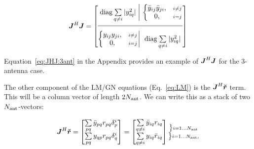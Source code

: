 \documentclass[useAMS,usenatbib]{mn2e}
\newcommand{\mat}[1]{{\bmath{#1}}}
\newcommand{\JJ}{\mat{J}} %
\begin{document}
\begin{equation}
\label{eq:JHJ:DI}
\JJ^H \JJ = 
\JHJblocksFull{
\mathrm{diag} \sum\limits_{q\ne i} |y_{iq}^2| 
}{
  \left \{ 
  \begin{array}{@{}cc@{}}
   \bar{y}_{ij} \bar{y}_{ji}, &{\scriptstyle i\ne j} \\
   0, &{\scriptstyle i=j}
  \end{array} \right .
}{
  \left \{ 
  \begin{array}{@{}cc@{}}
   y_{ij}y_{ji},&{\scriptstyle i\ne j} \\
   0, &{\scriptstyle i=j}
  \end{array} \right . 
}{
  \mathrm{diag} \sum\limits_{q\ne i} |y^2_{iq}| 
}
\end{equation}

Equation~\ref{eq:JHJ:3ant} in the Appendix provides an example of $\JJ^H\JJ$ for the 3-antenna case. 

\newcommand{\yysq}[2]{{y^2_{#1}+y^2_{#2}}}
\newcommand{\bb}[2]{{\bar{y}_{#1#2}\bar{y}_{#2#1}}}
\newcommand{\bbb}[2]{y_{#1#2}y_{#2#1}}

The other component of the LM/GN equations (Eq.~\ref{eq:LM}) is the $\JJ^H\Rr$ term. This will be a column vector of length $2N_\mathrm{ant}$. We can write this as a stack of two $N_\mathrm{ant}$-vectors:


\begin{equation}
\label{eq:JHR:DI}
\JJ^H\Rr = \Matrix{c}{ 
\sum\limits_{pq} \bar{y}_{pq} r_{pq} \delta^{i}_p  \\
\sum\limits_{pq} y_{qp} r_{pq} \delta^{i}_q 
} = \Matrix{c}{
\sum\limits_{q\ne i} \bar{y}_{iq} r_{iq}   \\
\sum\limits_{q\ne i} y_{iq} \bar{r}_{iq}  
}
\Stack{
\big \} \scriptstyle i=1\dots \Na \\ 
\big \} \scriptstyle i=1\dots \Na,
}
\end{equation}
\end{document}
